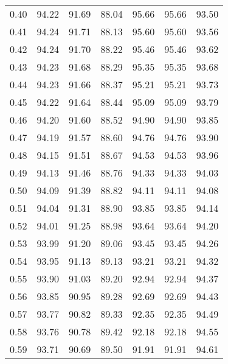 \begin{tabular}{|c|c|c|c|c|c|c|}
      0.40 &     94.22 &     91.69 &      88.04 &   95.66 &      95.66 &         93.50 \\
      0.41 &     94.24 &     91.71 &      88.13 &   95.60 &      95.60 &         93.56 \\
      0.42 &     94.24 &     91.70 &      88.22 &   95.46 &      95.46 &         93.62 \\
      0.43 &     94.23 &     91.68 &      88.29 &   95.35 &      95.35 &         93.68 \\
      0.44 &     94.23 &     91.66 &      88.37 &   95.21 &      95.21 &         93.73 \\
      0.45 &     94.22 &     91.64 &      88.44 &   95.09 &      95.09 &         93.79 \\
      0.46 &     94.20 &     91.60 &      88.52 &   94.90 &      94.90 &         93.85 \\
      0.47 &     94.19 &     91.57 &      88.60 &   94.76 &      94.76 &         93.90 \\
      0.48 &     94.15 &     91.51 &      88.67 &   94.53 &      94.53 &         93.96 \\
      0.49 &     94.13 &     91.46 &      88.76 &   94.33 &      94.33 &         94.03 \\
      0.50 &     94.09 &     91.39 &      88.82 &   94.11 &      94.11 &         94.08 \\
      0.51 &     94.04 &     91.31 &      88.90 &   93.85 &      93.85 &         94.14 \\
      0.52 &     94.01 &     91.25 &      88.98 &   93.64 &      93.64 &         94.20 \\
      0.53 &     93.99 &     91.20 &      89.06 &   93.45 &      93.45 &         94.26 \\
      0.54 &     93.95 &     91.13 &      89.13 &   93.21 &      93.21 &         94.32 \\
      0.55 &     93.90 &     91.03 &      89.20 &   92.94 &      92.94 &         94.37 \\
      0.56 &     93.85 &     90.95 &      89.28 &   92.69 &      92.69 &         94.43 \\
      0.57 &     93.77 &     90.82 &      89.33 &   92.35 &      92.35 &         94.49 \\
      0.58 &     93.76 &     90.78 &      89.42 &   92.18 &      92.18 &         94.55 \\
      0.59 &     93.71 &     90.69 &      89.50 &   91.91 &      91.91 &         94.61 \\

\end{tabular}
